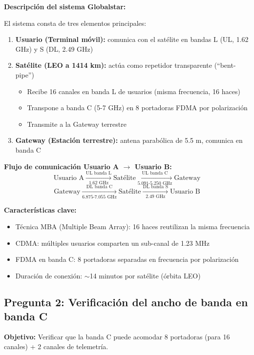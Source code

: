 \documentclass[a4paper,11pt]{article}
\begin{document}
\textbf{Descripción del sistema Globalstar:}

El sistema consta de tres elementos principales:
\begin{enumerate}
    \item \textbf{Usuario (Terminal móvil):} comunica con el satélite en bandas L (UL, 1.62 GHz) y S (DL, 2.49 GHz)
    \item \textbf{Satélite (LEO a 1414 km):} actúa como repetidor transparente (``bent-pipe'')
    \begin{itemize}
        \item Recibe 16 canales en banda L de usuarios (misma frecuencia, 16 haces)
        \item Transpone a banda C (5-7 GHz) en 8 portadoras FDMA por polarización
        \item Transmite a la Gateway terrestre
    \end{itemize}
    \item \textbf{Gateway (Estación terrestre):} antena parabólica de 5.5 m, comunica en banda C
\end{enumerate}

\textbf{Flujo de comunicación Usuario A $\rightarrow$ Usuario B:}
$$\boxed{\text{Usuario A} \xrightarrow[\text{1.62 GHz}]{\text{UL banda L}} \text{Satélite} \xrightarrow[\text{5.091-5.250 GHz}]{\text{UL banda C}} \text{Gateway}}$$
$$\boxed{\text{Gateway} \xrightarrow[\text{6.875-7.055 GHz}]{\text{DL banda C}} \text{Satélite} \xrightarrow[\text{2.49 GHz}]{\text{DL banda S}} \text{Usuario B}}$$

\textbf{Características clave:}
\begin{itemize}
    \item Técnica MBA (Multiple Beam Array): 16 haces reutilizan la misma frecuencia
    \item CDMA: múltiples usuarios comparten un sub-canal de 1.23 MHz
    \item FDMA en banda C: 8 portadoras separadas en frecuencia por polarización
    \item Duración de conexión: $\sim$14 minutos por satélite (órbita LEO)
\end{itemize}

\subsection*{Pregunta 2: Verificación del ancho de banda en banda C}

\textbf{Objetivo:} Verificar que la banda C puede acomodar 8 portadoras (para 16 canales) + 2 canales de telemetría.
\end{document}
